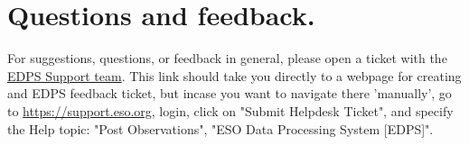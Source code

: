 

\section{Questions and feedback.}
\label{sec:faq}
For suggestions, questions, or feedback in general, please open a ticket with the \href{https://support.eso.org/new-ticket?ticket%5Bticket_field_13%5D%5Bdata%5D=227}{EDPS Support team}. 
This link should take you directly to a webpage for creating and EDPS feedback ticket, but incase you want to navigate there 'manually', go to \url{https://support.eso.org}, login, click on "Submit Helpdesk Ticket", and specify the Help topic: "Post Observations", "ESO Data Processing System [EDPS]".